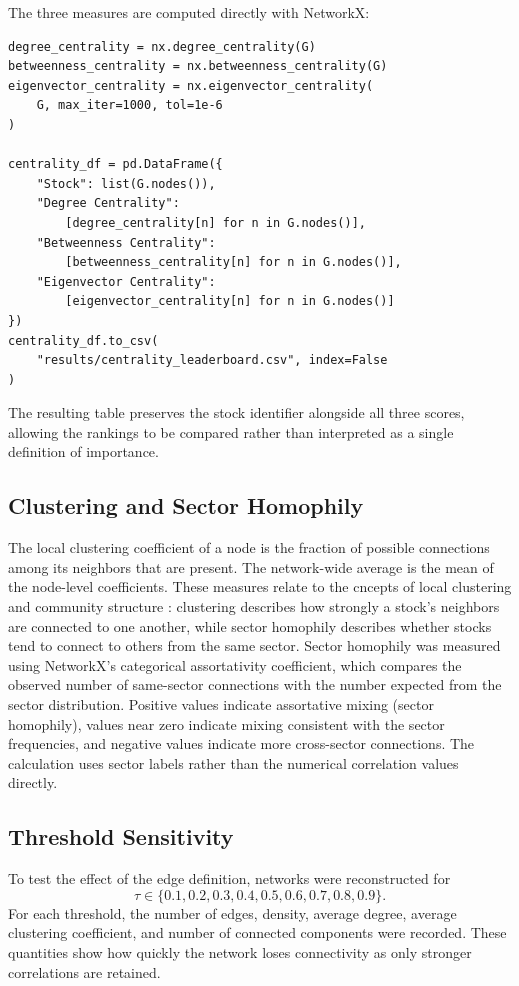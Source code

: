 \documentclass[12pt]{article}
\numberwithin{equation}{section}
\begin{document}
The three measures are computed directly with NetworkX:

\begin{lstlisting}[caption={Calculating the three centrality measures.}]
degree_centrality = nx.degree_centrality(G)
betweenness_centrality = nx.betweenness_centrality(G)
eigenvector_centrality = nx.eigenvector_centrality(
    G, max_iter=1000, tol=1e-6
)

centrality_df = pd.DataFrame({
    "Stock": list(G.nodes()),
    "Degree Centrality":
        [degree_centrality[n] for n in G.nodes()],
    "Betweenness Centrality":
        [betweenness_centrality[n] for n in G.nodes()],
    "Eigenvector Centrality":
        [eigenvector_centrality[n] for n in G.nodes()]
})
centrality_df.to_csv(
    "results/centrality_leaderboard.csv", index=False
)
\end{lstlisting}

The resulting table preserves the stock identifier alongside all three
scores, allowing the rankings to be compared rather than interpreted as a
single definition of importance.

\subsection{Clustering and Sector Homophily}
The local clustering coefficient of a node is the fraction of possible
connections among its neighbors that are present. The network-wide average is
the mean of the node-level coefficients. These measures relate to the cncepts of local clustering and community structure \cite{newman2018}:
clustering describes how
strongly a stock's neighbors are connected to one another, while sector
homophily describes whether stocks tend to connect to others from the same
sector. Sector homophily was measured using NetworkX's categorical
assortativity coefficient, which compares the observed number of same-sector
connections with the number expected from the sector distribution. Positive
values indicate assortative mixing (sector homophily), values near zero indicate
mixing consistent with the sector frequencies, and negative values indicate
more cross-sector connections. The calculation uses sector labels rather than
the numerical correlation values directly.

\subsection{Threshold Sensitivity}
To test the effect of the edge definition, networks were reconstructed for
\[
\tau\in\{0.1,0.2,0.3,0.4,0.5,0.6,0.7,0.8,0.9\}.
\]
For each threshold, the number of edges, density, average degree, average
clustering coefficient, and number of connected components were recorded.
These quantities show how quickly the network loses connectivity as only
stronger correlations are retained.
\end{document}
